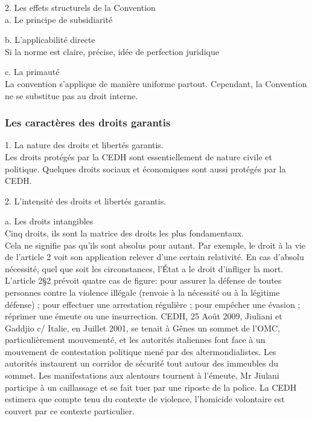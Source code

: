\documentclass[10pt, a4paper, openany]{book}
\begin{document}
2. Les effets structurels de la Convention \\
a. Le principe de subsidiarité


b. L'applicabilité directe \\
Si la norme est claire, précise, idée de perfection juridique


c. La primauté \\
La convention s'applique de manière uniforme partout. Cependant, la Convention ne se substitue pas au droit interne. 










\subsubsection{Les caractères des droits garantis}

1. La nature des droits et libertés garantis. \\
Les droits protégés par la CEDH sont essentiellement de nature civile et politique. Quelques droits sociaux et économiques sont aussi protégés par la CEDH. 


2. L'intensité des droits et libertés garantis.


a. Les droits intangibles \\
Cinq droits, ils sont la matrice des droits les plus fondamentaux. \\
Cela ne signifie pas qu'ils sont absolus pour autant. Par exemple, le droit à la vie de l'article 2 voit son application relever d'une certain relativité. En cas d'absolu nécessité, quel que soit les circonstances, l'État a le droit d'infliger la mort. L'article 2§2 prévoit quatre cas de figure: pour assurer la défense de toutes personnes contre la violence illégale (renvoie à la nécessité ou à la légitime défense) ; pour effectuer une arrestation régulière ; pour empêcher une évasion ; réprimer une émeute ou une insurrection. CEDH, 25 Août 2009, Jiuliani et Gaddjio c/ Italie, en Juillet 2001, se tenait à Gênes un sommet de l'OMC, particulièrement mouvementé, et les autorités italiennes font face à un mouvement de contestation politique mené par des altermondialistes. Les autorités instaurent un corridor de sécurité tout autour des immeubles du sommet. Les manifestations aux alentours tournent à l'émeute, Mr Jiulani participe  à un caillassage et se fait tuer par une riposte de la police. La CEDH estimera que compte tenu du contexte de violence, l'homicide volontaire est couvert par ce contexte particulier. 
\end{document}
